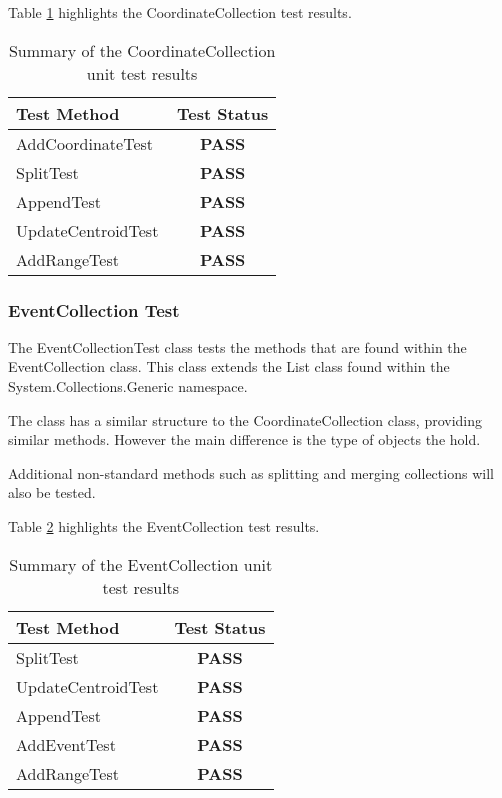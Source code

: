 Table \ref{tab:coordinate_collection_test} highlights the CoordinateCollection 
test results.

\begin{table}[h]
  \centering
  \begin{tabular}{|l|c|}
    \hline
    {\bfseries Test Method} & {\bfseries Test Status} \\ 
    \hline
    AddCoordinateTest       & {\bfseries \color{OliveGreen} PASS}   \\ 
    SplitTest               & {\bfseries \color{OliveGreen} PASS}   \\ 
    AppendTest              & {\bfseries \color{OliveGreen} PASS}   \\ 
    UpdateCentroidTest      & {\bfseries \color{OliveGreen} PASS}   \\ 
    AddRangeTest            & {\bfseries \color{OliveGreen} PASS}   \\
    \hline
  \end{tabular}
  \caption[Summary of the CoordinateCollection unit test results]
          {Summary of the CoordinateCollection unit test results}
  \label{tab:coordinate_collection_test}
\end{table}


\subsubsection{EventCollection Test}

The {\ttfamily EventCollectionTest} class tests the methods that are found 
within the EventCollection class. This class extends the List class found
within the {\ttfamily System.Collections.Generic} namespace.

The class has a similar structure to the {\ttfamily CoordinateCollection} 
class, providing similar methods. However the main difference is the type of 
objects the hold.

Additional non-standard methods such as splitting and merging collections will 
also be tested.

Table \ref{tab:event_collection_test} highlights the EventCollection test 
results.

\begin{table}[h]
  \centering
  \begin{tabular}{|l|c|}
    \hline
    {\bfseries Test Method} & {\bfseries Test Status} \\ 
    \hline
    SplitTest               & {\bfseries \color{OliveGreen} PASS}   \\ 
    UpdateCentroidTest      & {\bfseries \color{OliveGreen} PASS}   \\ 
    AppendTest              & {\bfseries \color{OliveGreen} PASS}   \\ 
    AddEventTest            & {\bfseries \color{OliveGreen} PASS}   \\ 
    AddRangeTest            & {\bfseries \color{OliveGreen} PASS}   \\
    \hline
  \end{tabular}
  \caption[Summary of the EventCollection unit test results]
          {Summary of the EventCollection unit test results}
  \label{tab:event_collection_test}
\end{table}


